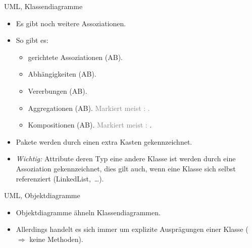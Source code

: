 \begin{frame}{UML, Klassendiagramme}
    \begin{itemize}[<+(1)->]
        \widei
        \item Es gibt noch weitere Assoziationen.
        \item So gibt es: \begin{itemize}
            \item gerichtete Assoziationen (A\;\;B).
            \item Abhängigkeiten (A\;\;B).
            \item Vererbungen (A\;\;B).
            \item Aggregationen (A\;\;B).\pause{} \textcolor{gray}{Markiert meist : .}
            \item Kompositionen (A\;\;B).\pause{} \textcolor{gray}{Markiert meist : }.
        \end{itemize}
        \item Pakete werden durch einen extra Kasten gekennzeichnet.
        \item \textit{Wichtig:} Attribute deren Typ eine andere Klasse ist werden durch eine Assoziation gekennzeichnet,\pause{} dies gilt auch, wenn eine Klasse sich selbst referenziert\pause{} (LinkedList,~\ldots).
    \end{itemize}
\end{frame}

\begin{frame}{UML, Objektdiagramme}
    \hypertarget<1>{uml:object}{}\begin{itemize}[<+(1)->]
        \widei
        \item Objektdiagramme ähneln Klassendiagrammen.
        \item Allerdings handelt es sich immer um explizite Ausprägungen einer Klasse\pause{} (\(\Rightarrow\) keine Methoden).
    \end{itemize}
    \vfill\pause{}
    \begin{center}
    \end{center}\vfill\null
\end{frame}

